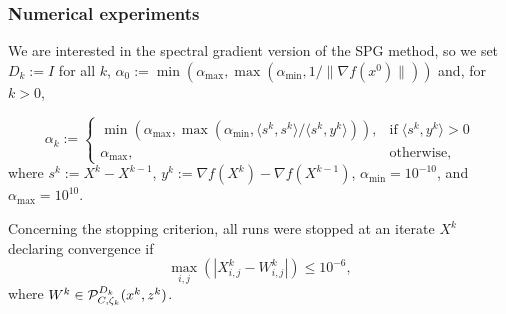 \begin{frame}[t]\frametitle{Numerical experiments}

We are interested in the \textcolor{UFGred}{spectral gradient version of the SPG method}, so we set $D_k:=I$ for all $k$, $\alpha_0 := \min(\alpha_{\max}, \max(\alpha_{\min}, 1/ \| \nabla f(x^0) \|))$ and, for $k>0$,

\begin{equation*}
\alpha_k:=\left\{
  \begin{array}{ll}
    \displaystyle\min (\alpha_{\max},\max (\alpha_{\min},\langle s^k,s^k\rangle/\langle s^k,y^k\rangle)), & \mbox{if} \; \langle s^k,y^k\rangle > 0\\
    \alpha_{\max}, & \mbox{otherwise},
  \end{array}\right.
\end{equation*}
where $s^k:=X^k - X^{k-1}$, $y^k:=\nabla f(X^k) - \nabla f(X^{k-1})$, $\alpha_{\min}=10^{-10}$, and $\alpha_{\max}=10^{10}$.


Concerning the stopping criterion, all runs were stopped at an iterate $X^k$ declaring convergence if
$$\displaystyle \max_{i,j} (|X^k_{i,j}-W^k_{i,j}| )\leq 10^{-6},$$ 
where $W^k \in {\cal P}_{C, \zeta_k}^{D_k}(x^{k}, z^k)$.
\end{frame}


